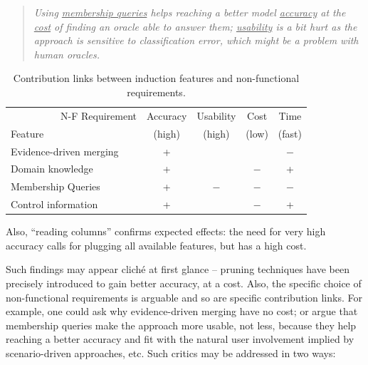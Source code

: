 \begin{quote}\emph{Using \underline{membership queries} helps reaching a better model \underline{accuracy} at the \underline{cost} of finding an oracle able to answer them; \underline{usability} is a bit hurt as the approach is sensitive to classification error, which might be a problem with human oracles.}\end{quote}

\begin{table}[h]
\renewcommand{\arraystretch}{1.3}
\begin{center}
\begin{tabular}{| l || c | c | c | c |}
\hline
~~~~~~~~~~N-F Requirement & Accuracy &   Usability    &    Cost    &  Time   \\
Feature                   &  (high)  &     (high)     &    (low)   & (fast)  \\
\hline
\hline
Evidence-driven merging   &    +     &                &            &   $-$   \\
Domain knowledge          &    +     &                &     $-$    &   +     \\
Membership Queries        &    +     &      $-$       &     $-$    &   $-$   \\
Control information       &    +     &                &     $-$    &   +     \\
\hline
\end{tabular}
\end{center}
\caption{Contribution links between induction features and non-functional requirements.\label{table:evaluation-contribution-links}}
\end{table}

Also, ``reading columns'' confirms expected effects: the need for very high accuracy calls for plugging all available features, but has a high cost. 

Such findings may appear clich\'e at first glance -- pruning techniques have been precisely introduced to gain better accuracy, at a cost. Also, the specific choice of non-functional requirements is arguable and so are specific contribution links. For example, one could ask why evidence-driven merging have no cost; or argue that membership queries make the approach more usable, not less, because they help reaching a better accuracy and fit with the natural user involvement implied by scenario-driven approaches, etc. Such critics may be addressed in two ways:

